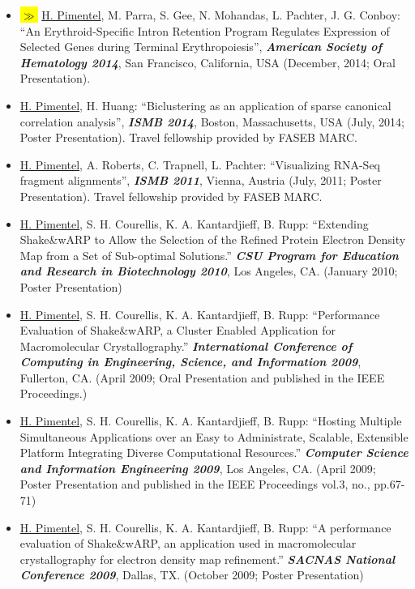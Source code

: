 \documentclass[11pt,notitlepage]{article} %
\newcommand{\hlc}[2][blue]{ {\sethlcolor{#1} \hl{#2}} }
\newcommand{\hlpub}{\hlc[Dandelion]{{\color{white}$\gg$} }}
\begin{document}
\begin{itemize}
\item \hlpub \underline{H. Pimentel}, M. Parra, S. Gee, N. Mohandas, L. Pachter, J. G.
Conboy: ``An Erythroid-Specific Intron Retention Program Regulates Expression
of Selected Genes during Terminal Erythropoiesis'', {\bf \emph{American Society
    of Hematology 2014}}, San Francisco, California, USA (December, 2014; Oral
Presentation).

\item \underline{H. Pimentel}, H. Huang: ``Biclustering as an application of sparse
canonical correlation analysis'', {\bf \emph{ISMB 2014}}, Boston, Massachusetts,
USA (July, 2014; Poster Presentation). Travel fellowship provided by FASEB
MARC.

\item \underline{H. Pimentel}, A. Roberts, C. Trapnell, L. Pachter: ``Visualizing
RNA-Seq fragment alignments'', {\bf \emph{ISMB 2011}}, Vienna, Austria (July,
2011; Poster Presentation). Travel fellowship provided by FASEB MARC.

\item \underline{H. Pimentel}, S. H. Courellis, K. A. Kantardjieff, B. Rupp:
``Extending Shake\&wARP to Allow the Selection of the Refined Protein Electron
Density Map from a Set of Sub-optimal Solutions.'' {\bf \emph{CSU Program for
    Education and Research in Biotechnology 2010}}, Los Angeles, CA. (January
2010; Poster Presentation)

\item \underline{H. Pimentel}, S. H. Courellis, K. A. Kantardjieff, B. Rupp:
``Performance Evaluation of Shake\&wARP, a Cluster Enabled Application for
Macromolecular Crystallography.'' {\bf \emph{International Conference of
    Computing in Engineering, Science, and Information
    2009}}, Fullerton, CA. (April 2009; Oral Presentation and published in the
         IEEE Proceedings.)

       \item \underline{H. Pimentel}, S. H. Courellis, K. A. Kantardjieff, B. Rupp:
``Hosting Multiple Simultaneous Applications over an Easy to
Administrate, Scalable, Extensible Platform Integrating Diverse
Computational Resources.'' {\bf \emph{Computer Science and Information
    Engineering 2009}}, Los Angeles,
CA. (April 2009; Poster Presentation and published in the
IEEE Proceedings vol.3, no., pp.67-71)

\item \underline{H. Pimentel}, S. H. Courellis, K. A. Kantardjieff, B. Rupp: ``A
performance evaluation of Shake\&wARP, an application used in macromolecular
crystallography for electron density map refinement.''  {\bf \emph{SACNAS
    National Conference 2009}}, Dallas, TX. (October 2009; Poster Presentation)


\end{itemize}
\end{document}
